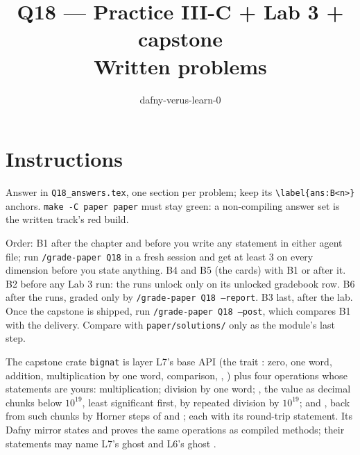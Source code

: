 \documentclass[11pt]{article}
\title{Q18 --- Practice III-C + Lab 3 + capstone \\ \large Written problems}
\author{dafny-verus-learn-0}
\date{}
\begin{document}
\maketitle
\sloppy

\section*{Instructions}
Answer in \texttt{Q18\_answers.tex}, one section per problem; keep its
\verb+\label{ans:B<n>}+ anchors. \texttt{make -C paper paper} must stay
green: a non-compiling answer set is the written track's red build.

Order: B1 after the chapter and before you write any statement in either
agent file; run \texttt{/grade-paper Q18} in a fresh session and get at
least 3 on every dimension before you state anything. B4 and B5 (the cards)
with B1 or after it. B2 before any Lab 3 run: the runs unlock only on its
unlocked gradebook row. B6 after the runs, graded only by \texttt{/grade-paper
Q18 --report}. B3 last, after the lab. Once the capstone is shipped,
run \texttt{/grade-paper Q18 --post}, which compares B1 with the delivery.
Compare with \texttt{paper/solutions/} only as the module's last step.

The capstone crate \texttt{bignat} is layer L7's base API (the trait
: zero, one word, addition, multiplication by one word,
comparison, , ) plus four operations whose statements
are yours: multiplication; division by one word; , the value
as decimal chunks below $10^{19}$, least significant first, by repeated
division by $10^{19}$; and , back from such chunks by Horner
steps of  and ; each with its round-trip
statement. Its Dafny mirror states and proves the same operations as compiled
methods; their statements may name L7's ghost  and L6's ghost
.
\end{document}
